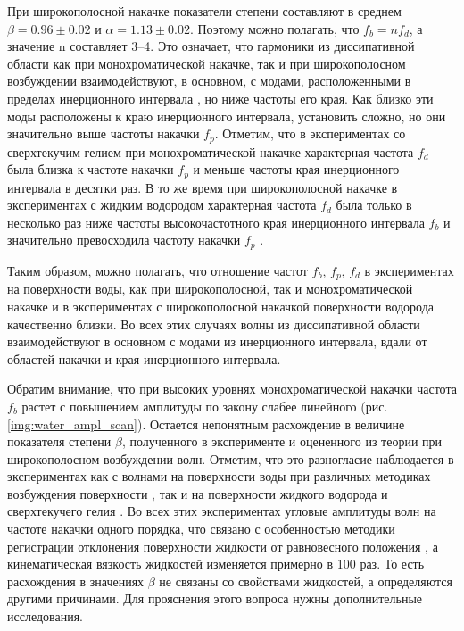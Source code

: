 При широкополосной накачке показатели степени составляют в среднем $\beta = 0.96 \pm 0.02$ и $\alpha = 1.13 \pm 0.02$. Поэтому можно полагать, что $f_b = n f_d$, а значение n составляет 3–4. Это означает, что гармоники из диссипативной области как при монохроматической накачке, так и при широкополосном возбуждении взаимодействуют, в основном, с модами, расположенными в пределах инерционного интервала \cite{F1}, но ниже частоты его края. Как близко эти моды расположены к краю инерционного интервала, установить сложно, но они значительно выше частоты накачки $f_p$.
Отметим, что в экспериментах со сверхтекучим гелием при монохроматической накачке характерная частота $f_d$ была близка к частоте накачки $f_p$ \cite{F2} и меньше частоты края инерционного интервала в десятки раз. В то же время при широкополосной накачке в экспериментах с жидким водородом характерная частота $f_d$ была только в несколько раз ниже частоты высокочастотного края инерционного интервала $f_b$ и значительно превосходила частоту накачки $f_p$ \cite{F1}.

Таким образом, можно полагать, что отношение частот $f_b$, $f_p$, $f_d$ в экспериментах на поверхности воды, как при широкополосной, так и монохроматической накачке и в экспериментах с широкополосной накачкой поверхности водорода качественно близки. Во всех этих случаях волны из диссипативной области взаимодействуют в основном с модами из инерционного интервала, вдали от областей накачки и края инерционного интервала.

Обратим внимание, что при высоких уровнях монохроматической накачки частота $f_b$ растет с повышением амплитуды по закону слабее линейного (рис. \ref{img:water_ampl_scan}). Остается непонятным расхождение в величине показателя степени $\beta$, полученного в эксперименте и оцененного из теории при широкополосном возбуждении волн. Отметим, что это разногласие наблюдается в экспериментах как с волнами на поверхности воды при различных методиках возбуждения поверхности \cite{BrazhnikovWater}, так и на поверхности жидкого водорода \cite{Brazhnikov_liq_hydr} и сверхтекучего гелия \cite{F2}. Во всех этих экспериментах угловые амплитуды волн на частоте накачки одного порядка, что связано с особенностью методики регистрации отклонения поверхности жидкости от равновесного положения \cite{Brazhnikov_IET}, а кинематическая вязкость жидкостей изменяется примерно в 100 раз. То есть расхождения в значениях $\beta$ не связаны со свойствами жидкостей, а определяются другими причинами. Для прояснения этого вопроса нужны дополнительные исследования.

